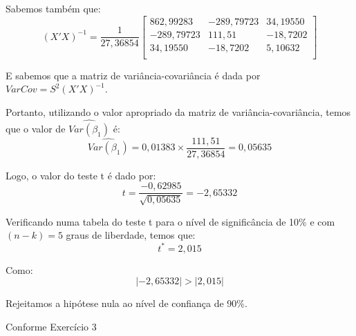 \documentclass[]{ufpe-exercises}
\begin{document}
\begin{questions}
\begin{parts}
\begin{solution}
			Sabemos também que:
			\[
				(X'X)^{-1} = \frac{1}{27,36854}
				\begin{bmatrix}
					862,99283  & -289,79723 & 34,19550 \\
					-289,79723 & 111,51     & -18,7202 \\
					34,19550   & -18,7202   & 5,10632  \\
				\end{bmatrix}
			\]

			E sabemos que a matriz de variância-covariância é dada por \(VarCov = S^{2}(X'X)^{-1}\).

			Portanto, utilizando o valor apropriado da matriz de variância-covariância, temos que o valor de \(\widehat{Var(\beta_{1})}\) é:
			\[ \widehat{Var(\beta_{1})} = 0,01383 \times \frac{111,51}{27,36854} = 0,05635 \]

			Logo, o valor do teste t é dado por:
			\[ t = \frac{-0,62985}{\sqrt{0,05635}} = -2,65332 \]

			Verificando numa tabela do teste t para o nível de significância de 10\% e com \((n - k) = 5\) graus de liberdade, temos que:
			\[ t^{*} = 2,015 \]

			Como:
			\[\lvert -2,65332 \rvert > \lvert 2,015 \rvert\]

			Rejeitamos a hipótese nula ao nível de confiança de 90\%.

		\end{solution}

	\end{parts}

	\question Conforme Exercício 3

\end{questions}
\end{document}
